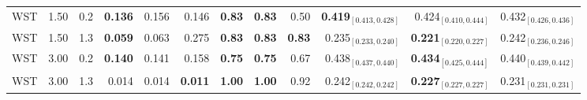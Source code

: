 \begin{table}[!h]
\begin{tabular}[t]{lrrrrrrrrrrr}
WST & 1.50 & 0.2 & \textbf{0.136} & 0.156 & 0.146 & \textbf{0.83} & \textbf{0.83} & 0.50 & \textbf{0.419$_{[0.413,0.428]}$} & 0.424$_{[0.410,0.444]}$ & 0.432$_{[0.426,0.436]}$\\
WST & 1.50 & 1.3 & \textbf{0.059} & 0.063 & 0.275 & \textbf{0.83} & \textbf{0.83} & \textbf{0.83} & 0.235$_{[0.233,0.240]}$ & \textbf{0.221$_{[0.220,0.227]}$} & 0.242$_{[0.236,0.246]}$\\
WST & 3.00 & 0.2 & \textbf{0.140} & 0.141 & 0.158 & \textbf{0.75} & \textbf{0.75} & 0.67 & 0.438$_{[0.437,0.440]}$ & \textbf{0.434$_{[0.425,0.444]}$} & 0.440$_{[0.439,0.442]}$\\
WST & 3.00 & 1.3 & 0.014 & 0.014 & \textbf{0.011} & \textbf{1.00} & \textbf{1.00} & 0.92 & 0.242$_{[0.242,0.242]}$ & \textbf{0.227$_{[0.227,0.227]}$} & 0.231$_{[0.231,0.231]}$\\
\bottomrule
\end{tabular}
\end{table}

